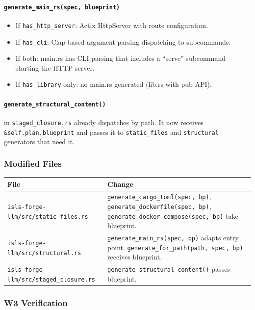 \documentclass[11pt,a4paper]{article}
\begin{document}
\paragraph{\texttt{generate\_main\_rs(spec, blueprint)}}

\begin{itemize}[nosep]
\item If \texttt{has\_http\_server}: Actix HttpServer with route 
      configuration.
\item If \texttt{has\_cli}: Clap-based argument parsing dispatching 
      to subcommands.
\item If both: main.rs has CLI parsing that includes a ``serve'' 
      subcommand starting the HTTP server.
\item If \texttt{has\_library} only: no main.rs generated 
      (lib.rs with pub API).
\end{itemize}

\paragraph{\texttt{generate\_structural\_content()}} in 
\texttt{staged\_closure.rs} already dispatches by path. It now 
receives \texttt{\&self.plan.blueprint} and passes it to 
\texttt{static\_files} and \texttt{structural} generators that 
need it.

\subsubsection{Modified Files}

\begin{longtable}{lp{10cm}}
\toprule
\textbf{File} & \textbf{Change} \\
\midrule
\texttt{isls-forge-llm/src/static\_files.rs}
  & \texttt{generate\_cargo\_toml(spec, bp)}, 
    \texttt{generate\_dockerfile(spec, bp)}, 
    \texttt{generate\_docker\_compose(spec, bp)} take blueprint. \\
\texttt{isls-forge-llm/src/structural.rs}
  & \texttt{generate\_main\_rs(spec, bp)} adapts entry point.
    \texttt{generate\_for\_path(path, spec, bp)} receives blueprint.\\
\texttt{isls-forge-llm/src/staged\_closure.rs}
  & \texttt{generate\_structural\_content()} passes blueprint. \\
\bottomrule
\end{longtable}

\subsubsection{W3 Verification}
\end{document}
